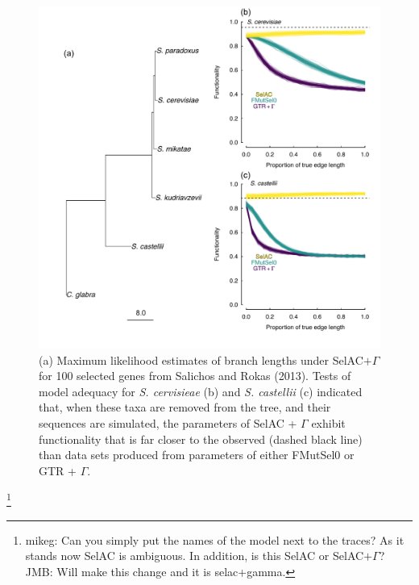 \documentclass{article}
\newcommand{\selac}{SelAC\xspace}
\newcommand{\selacplusgamma}{SelAC$+\Gamma$\xspace}
\begin{document}
\begin{figure}[H]
  \centering
  \includegraphics[width=0.9\linewidth]{FIGURE_3_Inferred_Tree_AND_Model_Adequacy.pdf}
  \caption{(a) Maximum likelihood estimates of branch lengths under \selacplusgamma for 100 selected genes from Salichos and Rokas (2013).  
    Tests of model adequacy for \emph{S. cervisieae} (b) and \emph{S. castellii} (c) indicated that, when these taxa are removed from the tree, and their sequences are simulated, the parameters of SelAC + $\Gamma$ exhibit functionality that is far closer to the observed (dashed black line) than data sets produced from parameters of either FMutSel0 or GTR + $\Gamma$. 
}
  \label{fig:TreeAndAdequacy}
\end{figure}
\footnote{mikeg: Can you simply put the names of the model next to the traces?  As it stands now \selac is ambiguous.
      In addition, is this \selac or \selacplusgamma? JMB: Will make this change and it is selac+gamma.
  } 


\clearpage

\setcounter{figure}{0}
\setcounter{table}{0}
\setcounter{page}{1}
\setcounter{section}{0}

\renewcommand{\thefigure}{S\arabic{figure}}
\renewcommand{\thetable}{S\arabic{table}}
\renewcommand{\thepage}{S\arabic{page}}
\renewcommand{\thesection}{\arabic{section}} %
\renewcommand{\appendixname}{Supporting Materials}
\renewcommand{\theequation}{S\arabic{equation}}
\end{document}
